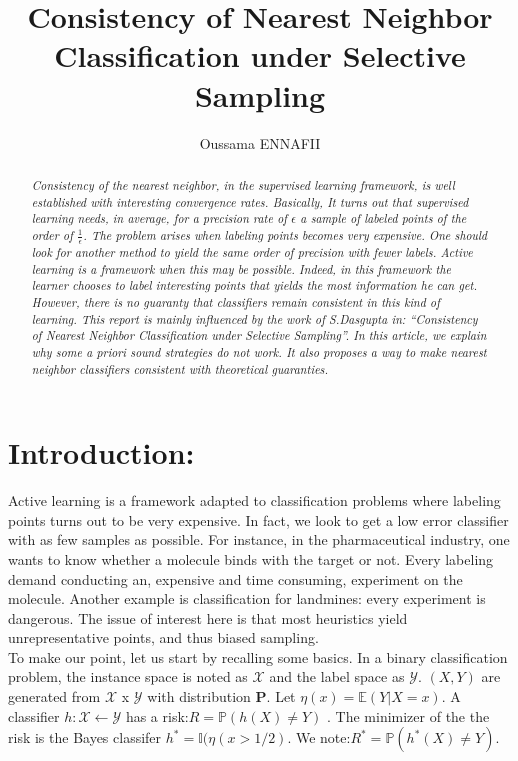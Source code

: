 \documentclass[onecolumn,12pt]{article}
\title{\textbf{Consistency of Nearest Neighbor Classification under Selective
Sampling}}
\author{Oussama ENNAFII}
\begin{document}
\maketitle

\begin{abstract}
\textit{Consistency of the nearest neighbor, in the supervised learning framework, is well established with interesting convergence rates. Basically, It turns out that supervised learning needs, in average, for a precision rate of $\epsilon $ a sample of labeled points of the order of $\frac{1}{\epsilon}$. The problem arises when labeling points becomes very expensive. One should look for another method to yield the same order of precision with fewer labels. Active learning is a framework when this may be possible. Indeed, in this framework the learner chooses to label interesting points that yields the most information he can get. However, there is no guaranty that classifiers remain consistent in this kind of learning. This report is mainly influenced by the work of S.Dasgupta in: “Consistency of Nearest Neighbor Classification under Selective Sampling”. In this article, we explain why some \textit{a priori} sound strategies do not work. It also proposes a way to make nearest neighbor classifiers consistent with theoretical guaranties. }
\end{abstract}


\section{Introduction:}


Active learning is a framework adapted to classification problems where labeling points turns out to be very expensive. In fact, we look to get a low error classifier with as few samples as possible. For instance, in the pharmaceutical industry, one wants to know whether a molecule binds with the target or not. Every labeling demand conducting an, expensive and time consuming, experiment on the molecule. Another example is classification for landmines: every experiment is dangerous. The issue of interest here is that most heuristics yield unrepresentative points, and thus biased sampling.\\

To make our point, let us start by recalling some basics. In a binary classification problem, the instance space is noted as $ \mathscr{X} $ and the label space as $\mathscr{Y}$. $(X,Y)$ are generated from $\mathscr{X}$ x $\mathscr{Y}$ with distribution $\textbf{P}$. Let $ \eta(x) = \mathbb{E}(Y|X=x) $. A classifier $h: \mathscr{X} \leftarrow\mathscr{Y}$ has a risk:$R=\mathbb{P}(h(X) \neq Y)$ . The minimizer of the the risk is the Bayes classifer $h^* = \mathbb{I}( \eta( x > 1/2)$. We note:$R^*=\mathbb{P}(h^*(X) \neq Y)$.\\
\end{document}
